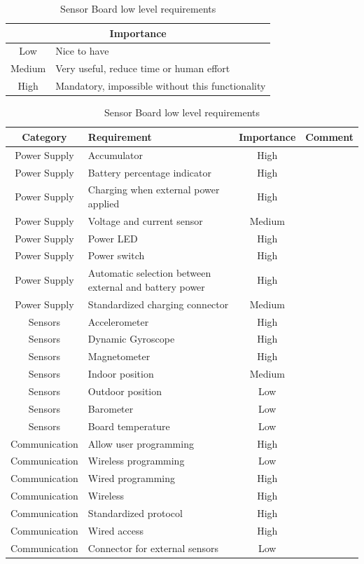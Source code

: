 \begin{table}[]
\centering
\caption{Sensor Board low level requirements}
\label{tab:requirements}
\begin{tabular}{|c|p{10cm}|}
	\hline
	\multicolumn{2}{|c|}{Importance} \\ \hline \hline
	Low	& Nice to have \\ \hline
	Medium & Very useful, reduce time or human effort \\ \hline
	High & Mandatory, impossible without this functionality \\ \hline
\end{tabular}
\newline
\vspace{1cm}
\newline
\begin{tabular}{|c|p{5cm}|c|l|}
\hline
Category & Requirement & Importance & Comment \\ \hline \hline
Power Supply & Accumulator & High &         \\ \hline
Power Supply & Battery percentage indicator & High &  \\ \hline
Power Supply & Charging when external power applied & High &  \\ \hline
Power Supply & Voltage and current sensor & Medium &  \\ \hline
Power Supply & Power LED & High &  \\ \hline
Power Supply & Power switch & High &  \\ \hline
Power Supply & Automatic selection between external and battery power & High &  \\ \hline
Power Supply & Standardized charging connector & Medium &  \\ \hline

Sensors & Accelerometer & High &  \\ \hline
Sensors & Dynamic Gyroscope & High &  \\ \hline
Sensors & Magnetometer & High &  \\ \hline
Sensors & Indoor position & Medium &  \\ \hline
Sensors & Outdoor position & Low &  \\ \hline
Sensors & Barometer & Low &  \\ \hline
Sensors & Board temperature & Low &  \\ \hline

Communication & Allow user programming & High &  \\ \hline
Communication & Wireless programming & Low &  \\ \hline
Communication & Wired programming & High &  \\ \hline
Communication & Wireless & High &  \\ \hline
Communication & Standardized protocol & High &  \\ \hline
Communication & Wired access & High &  \\ \hline
Communication & Connector for external sensors & Low &  \\ \hline


\end{tabular}
\end{table}
